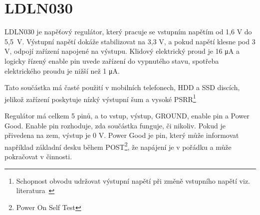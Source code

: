 \documentclass[a4paper, 12pt]{report}
\begin{document}
    \section{LDLN030}
    LDLN030 je napěťový regulátor, který pracuje se vstupním napětím od 1,6 V do 5,5~V. Výstupní napětí dokáže stabilizovat na 3,3 V, a pokud napětí klesne pod 3 V, odpojí zařízení napojené na výstupu.
    Klidový elektrický proud je 16 \si{\micro A} a logicky řízený enable pin uvede zařízení do vypnutého stavu, spotřeba elektrického proudu je nižší než 1 \si{\micro A}. \par
    Tato součástka má časté použití v mobilních telefonech, HDD a SSD discích, jelikož zařízení poskytuje nízký výstupní šum a vysoké PSRR\footnote{Schopnost obvodu udržovat výstupní napětí při změně vstupního napětí viz. literatura~\cite{PSRR}} \par
    Regulátor má celkem 5 pinů, a to vstup, výstup, GROUND, enable pin a Power Good.
    Enable pin rozhoduje, zda součástka funguje, či nikoliv. Pokud je přivedena na zem, výstup je 0 V. Power Good je pin, který může informovat například základní desku během POST\footnote{Power On Self Test}, že napájení je v pořádku a může pokračovat v činnosti.
\end{document}
